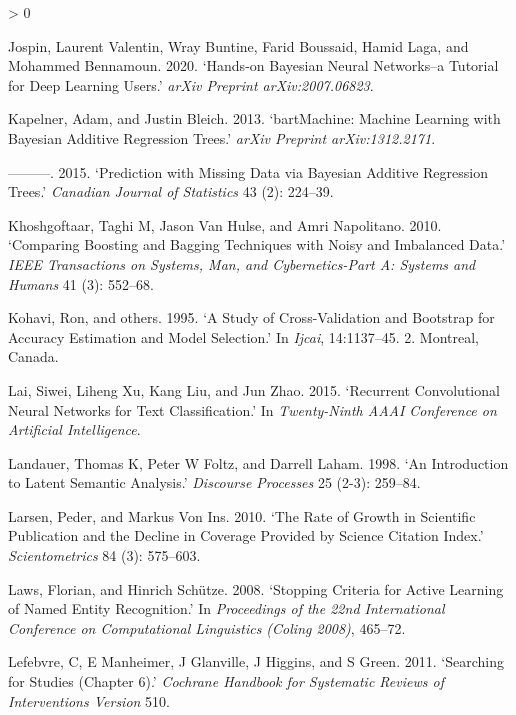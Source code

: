 \documentclass{article}
\newlength{\cslhangindent}
\newenvironment{CSLReferences}[2] %
 {%
  \setlength{\parindent}{0pt}
  \ifodd #1 \everypar{\setlength{\hangindent}{\cslhangindent}}\ignorespaces\fi
  \ifnum #2 > 0
  \setlength{\parskip}{#2\baselineskip}
  \fi
 }%
 {}
\begin{document}
\begin{CSLReferences}{1}{0}
\leavevmode\hypertarget{ref-jospin2020hands}{}%
Jospin, Laurent Valentin, Wray Buntine, Farid Boussaid, Hamid Laga, and
Mohammed Bennamoun. 2020. {`Hands-on Bayesian Neural Networks--a
Tutorial for Deep Learning Users.'} \emph{arXiv Preprint
arXiv:2007.06823}.

\leavevmode\hypertarget{ref-kapelner2013bartmachine}{}%
Kapelner, Adam, and Justin Bleich. 2013. {`bartMachine: Machine Learning
with Bayesian Additive Regression Trees.'} \emph{arXiv Preprint
arXiv:1312.2171}.

\leavevmode\hypertarget{ref-kapelner2015prediction}{}%
---------. 2015. {`Prediction with Missing Data via Bayesian Additive
Regression Trees.'} \emph{Canadian Journal of Statistics} 43 (2):
224--39.

\leavevmode\hypertarget{ref-khoshgoftaar2010comparing}{}%
Khoshgoftaar, Taghi M, Jason Van Hulse, and Amri Napolitano. 2010.
{`Comparing Boosting and Bagging Techniques with Noisy and Imbalanced
Data.'} \emph{IEEE Transactions on Systems, Man, and Cybernetics-Part A:
Systems and Humans} 41 (3): 552--68.

\leavevmode\hypertarget{ref-kohavi1995study}{}%
Kohavi, Ron, and others. 1995. {`A Study of Cross-Validation and
Bootstrap for Accuracy Estimation and Model Selection.'} In
\emph{Ijcai}, 14:1137--45. 2. Montreal, Canada.

\leavevmode\hypertarget{ref-lai2015recurrent}{}%
Lai, Siwei, Liheng Xu, Kang Liu, and Jun Zhao. 2015. {`Recurrent
Convolutional Neural Networks for Text Classification.'} In
\emph{Twenty-Ninth AAAI Conference on Artificial Intelligence}.

\leavevmode\hypertarget{ref-landauer1998introduction}{}%
Landauer, Thomas K, Peter W Foltz, and Darrell Laham. 1998. {`An
Introduction to Latent Semantic Analysis.'} \emph{Discourse Processes}
25 (2-3): 259--84.

\leavevmode\hypertarget{ref-larsen2010rate}{}%
Larsen, Peder, and Markus Von Ins. 2010. {`The Rate of Growth in
Scientific Publication and the Decline in Coverage Provided by Science
Citation Index.'} \emph{Scientometrics} 84 (3): 575--603.

\leavevmode\hypertarget{ref-laws2008stopping}{}%
Laws, Florian, and Hinrich Schütze. 2008. {`Stopping Criteria for Active
Learning of Named Entity Recognition.'} In \emph{Proceedings of the 22nd
International Conference on Computational Linguistics (Coling 2008)},
465--72.

\leavevmode\hypertarget{ref-lefebvre2011searching}{}%
Lefebvre, C, E Manheimer, J Glanville, J Higgins, and S Green. 2011.
{`Searching for Studies (Chapter 6).'} \emph{Cochrane Handbook for
Systematic Reviews of Interventions Version} 510.


\end{CSLReferences}
\end{document}
